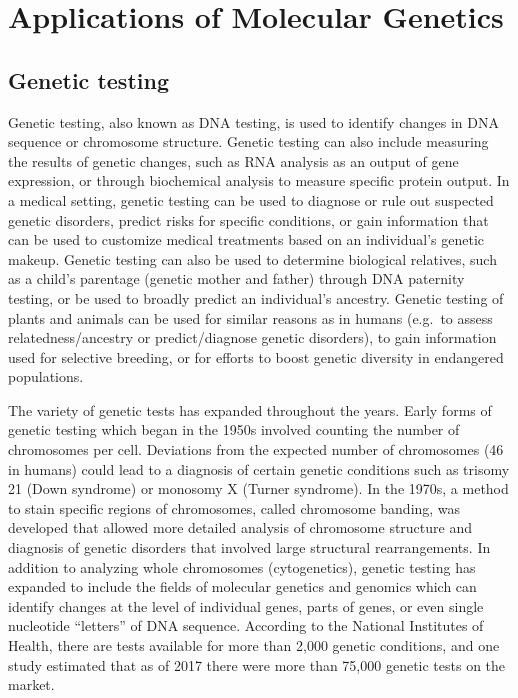 \chapter{Applications of Molecular Genetics}\label{applications-of-molecular-genetics}

\hypertarget{genetic-testing}{%
\section{Genetic testing}\label{genetic-testing}}

Genetic testing, also known as DNA testing, is used to identify changes in DNA sequence or chromosome structure. Genetic testing can also include measuring the results of genetic changes, such as RNA analysis as an output of gene expression, or through biochemical analysis to measure specific protein output. In a medical setting, genetic testing can be used to diagnose or rule out suspected genetic disorders, predict risks for specific conditions, or gain information that can be used to customize medical treatments based on an individual's genetic makeup. Genetic testing can also be used to determine biological relatives, such as a child's parentage (genetic mother and father) through DNA paternity testing, or be used to broadly predict an individual's ancestry. Genetic testing of plants and animals can be used for similar reasons as in humans (e.g.~to assess relatedness/ancestry or predict/diagnose genetic disorders), to gain information used for selective breeding, or for efforts to boost genetic diversity in endangered populations.

The variety of genetic tests has expanded throughout the years. Early forms of genetic testing which began in the 1950s involved counting the number of chromosomes per cell. Deviations from the expected number of chromosomes (46 in humans) could lead to a diagnosis of certain genetic conditions such as trisomy 21 (Down syndrome) or monosomy X (Turner syndrome). In the 1970s, a method to stain specific regions of chromosomes, called chromosome banding, was developed that allowed more detailed analysis of chromosome structure and diagnosis of genetic disorders that involved large structural rearrangements. In addition to analyzing whole chromosomes (cytogenetics), genetic testing has expanded to include the fields of molecular genetics and genomics which can identify changes at the level of individual genes, parts of genes, or even single nucleotide ``letters'' of DNA sequence. According to the National Institutes of Health, there are tests available for more than 2,000 genetic conditions, and one study estimated that as of 2017 there were more than 75,000 genetic tests on the market.

